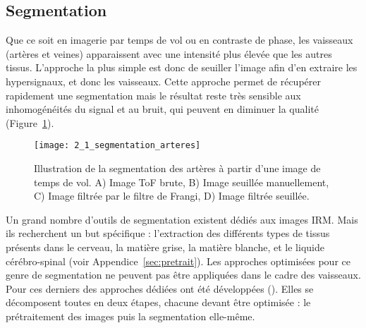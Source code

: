 \subsection{Segmentation}
\label{sec:segmentation}
Que ce soit en imagerie par temps de vol ou en contraste de phase, les vaisseaux (artères et veines) apparaissent avec une intensité plus élevée que les autres tissus. L’approche la plus simple est donc de seuiller l’image afin d’en extraire les hypersignaux, et donc les vaisseaux. Cette approche permet de récupérer rapidement une segmentation mais le résultat reste très sensible aux inhomogénéités du signal et au bruit, qui peuvent en diminuer la qualité (Figure~\ref{fig:2_1_segmentation_arteres}).\\
\begin{figure}[!t]
\centering
\texttt{[image: 2\_1\_segmentation\_arteres]}
\caption{Illustration de la segmentation des artères à partir d’une image de temps de vol. A) Image ToF brute, B) Image seuillée manuellement, C) Image filtrée par le filtre de Frangi, D) Image filtrée seuillée.}
\label{fig:2_1_segmentation_arteres}	
\end{figure}
Un grand nombre d’outils de segmentation existent dédiés aux images IRM. Mais ils recherchent un but spécifique : l’extraction des différents types de tissus présents dans le cerveau, la matière grise, la matière blanche, et le liquide cérébro-spinal (voir Appendice~\ref{sec:pretrait}).  Les approches optimisées pour ce genre de segmentation ne peuvent pas être appliquées dans le cadre des vaisseaux. Pour ces derniers des approches dédiées ont été développées (\cite{Lesage2009}). Elles se décomposent toutes en deux étapes, chacune devant être optimisée : le prétraitement des images puis la segmentation elle-même.\\

